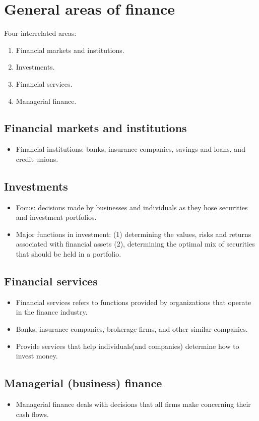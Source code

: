 \documentclass{article}
\begin{document}
\section{General areas of finance}
Four interrelated areas:
\begin{enumerate}
    \item Financial markets and institutions. 
    \item Investments. 
    \item Financial services.
    \item Managerial finance. 
\end{enumerate}
\subsection{Financial markets and institutions}
\begin{itemize}
    \item Financial institutions: banks, insurance companies, savings and loans, and credit unions.
\end{itemize}
\subsection{Investments}
\begin{itemize}
    \item Focus: decisions made by businesses and individuals as they hose securities and investment portfolios.
    \item Major functions in investment: (1) determining the values, risks and returns associated with financial assets (2), determining the optimal mix of securities that should be held in a portfolio.
\end{itemize}
\subsection{Financial services}
\begin{itemize}
    \item Financial services refers to functions provided by organizations that operate in the finance industry.
    \item Banks, insurance companies, brokerage firms, and other similar companies.
    \item Provide services that help individuals(and companies) determine how to invest money. 
\end{itemize}
\subsection{Managerial (business) finance}
\begin{itemize}
    \item Managerial finance deals with decisions that all firms make concerning their cash flows.
\end{itemize}
\end{document}
